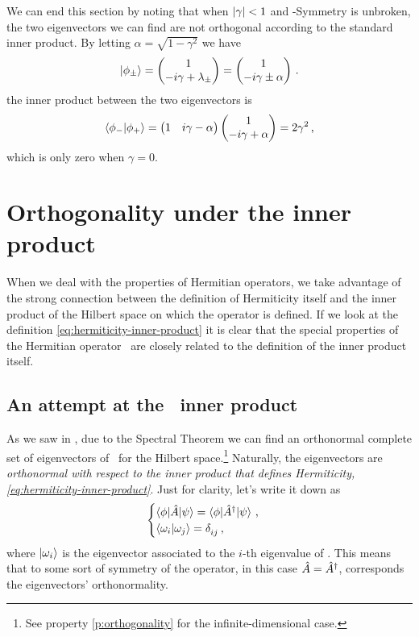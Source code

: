         We can end this section by noting that when $\abs{\gamma} < 1$ and \PT-Symmetry is unbroken, the two eigenvectors we can find are not orthogonal according to the standard inner product. By letting $\alpha = \sqrt{1 - \gamma^2}$ we have 
        \begin{equation*}
            \ket{\phi_\pm} = \pmqty{1 \\ -i\gamma + \lambda_\pm} = \pmqty{1 \\ -i\gamma \pm \alpha}
            \myperiod
        \end{equation*}
        the inner product between the two eigenvectors is
        \begin{equation}
            \label{eq:ex:non-orthogonality}
            \bra{\phi_-}\ket{\phi_+} = \pmqty{1 & i\gamma - \alpha}\pmqty{1 \\ -i\gamma + \alpha} = 2 \gamma^2
            \mycomma
        \end{equation}
        which is only zero when $\gamma = 0$.

    \section{Orthogonality under the \texorpdfstring{\PT}{PT} inner product}\label{s:orthogonality}
        When we deal with the properties of Hermitian operators, we take advantage of the strong connection between the definition of Hermiticity itself and the inner product of the Hilbert space on which the operator is defined. If we look at the definition \eqref{eq:hermiticity-inner-product} it is clear that the special properties of the Hermitian operator \hA\ are closely related to the definition of the inner product itself.
        
        \subsection{An attempt at the \PT\ inner product}
            As we saw in , due to the Spectral Theorem we can find an orthonormal complete set of eigenvectors of \hA\ for the Hilbert space.\footnote{See property \ref{p:orthogonality} for the infinite-dimensional case.} Naturally, the eigenvectors are \emph{orthonormal with respect to the inner product that defines Hermiticity, \eqref{eq:hermiticity-inner-product}}. Just for clarity, let's write it down as
            \begin{equation*}
                \begin{cases}
                    \bra{\phi} \! \hA \! \ket{\psi} = \bra{\phi} \! \hA^\dag \! \ket{\psi}
                    \mycomma \\
                    \braket{\omega_i}{\omega_j} = \tensor{\delta}{_i_j}
                    \mycomma
                \end{cases}
            \end{equation*}
            where $\ket{\omega_i}$ is the eigenvector associated to the $i$-th eigenvalue of \hA. This means that to some sort of symmetry of the operator, in this case $\hat{A} = \hat{A}^\dag$, corresponds the eigenvectors' orthonormality.

